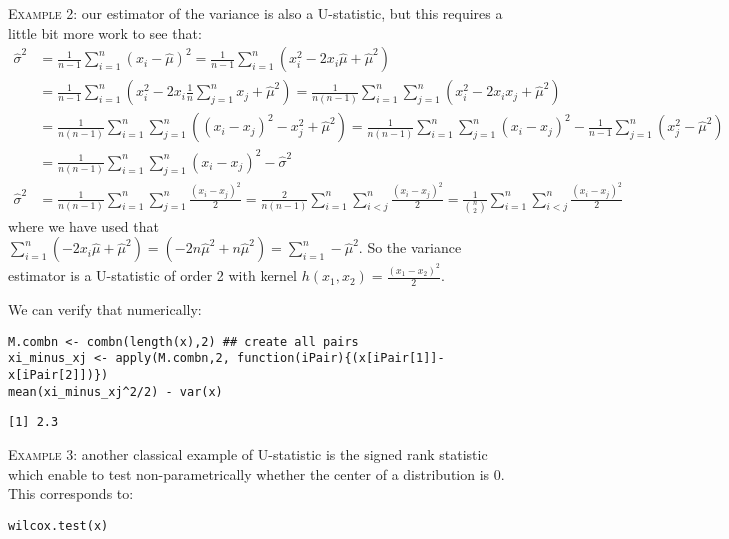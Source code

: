 \documentclass[12pt]{article}
\begin{document}
\textsc{Example 2}: our estimator of the variance is also a
U-statistic, but this requires a little bit more work to see that:
\begin{align*}
\hat{\sigma}^2 &= \frac{1}{n-1} \sum_{i=1}^n (x_i-\hat{\mu})^2 = \frac{1}{n-1} \sum_{i=1}^n \left(x_i^2 - 2 x_i \hat{\mu} + \hat{\mu}^2\right) \\
&=  \frac{1}{n-1} \sum_{i=1}^n \left(x_i^2 - 2 x_i \frac{1}{n} \sum_{j=1}^n x_j + \hat{\mu}^2\right) =  \frac{1}{n(n-1)} \sum_{i=1}^n \sum_{j=1}^n \left( x_i^2 - 2 x_i  x_j + \hat{\mu}^2 \right) \\
&=  \frac{1}{n(n-1)} \sum_{i=1}^n \sum_{j=1}^n \left( (x_i - x_j)^2 - x_j^2 + \hat{\mu}^2 \right) =  \frac{1}{n(n-1)} \sum_{i=1}^n \sum_{j=1}^n (x_i - x_j)^2 - \frac{1}{n-1} \sum_{j=1}^n \left(x_j^2 - \hat{\mu}^2\right) \\
&=  \frac{1}{n(n-1)} \sum_{i=1}^n \sum_{j=1}^n (x_i - x_j)^2 - \hat{\sigma}^2 \\
\hat{\sigma}^2 &=  \frac{1}{n(n-1)} \sum_{i=1}^n \sum_{j=1}^n \frac{(x_i - x_j)^2}{2} 
=  \frac{2}{n(n-1)} \sum_{i=1}^n \sum_{i<j}^n \frac{(x_i - x_j)^2}{2}
=  \frac{1}{{n \choose 2}} \sum_{i=1}^n \sum_{i<j}^n \frac{(x_i - x_j)^2}{2} 
\end{align*}
where we have used that \(\sum_{i=1}^n \left( - 2 x_i \hat{\mu} +
\hat{\mu}^2\right) = \left( - 2 n \hat{\mu}^2 + n \hat{\mu}^2\right) =
\sum_{i=1}^n - \hat{\mu}^2\). So the variance estimator is a
U-statistic of order 2 with kernel \(h(x_1,x_2)=\frac{(x_1 -
x_2)^2}{2}\).

\clearpage

We can verify that numerically:
\lstset{language=r,label= ,caption= ,captionpos=b,numbers=none}
\begin{lstlisting}
M.combn <- combn(length(x),2) ## create all pairs
xi_minus_xj <- apply(M.combn,2, function(iPair){(x[iPair[1]]-x[iPair[2]])})
mean(xi_minus_xj^2/2) - var(x)
\end{lstlisting}

\begin{verbatim}
[1] 2.3
\end{verbatim}


\bigskip

\textsc{Example 3}: another classical example of U-statistic is the
signed rank statistic which enable to test non-parametrically whether
the center of a distribution is 0. This corresponds to:
\lstset{language=r,label= ,caption= ,captionpos=b,numbers=none}
\begin{lstlisting}
wilcox.test(x)
\end{lstlisting}
\end{document}
